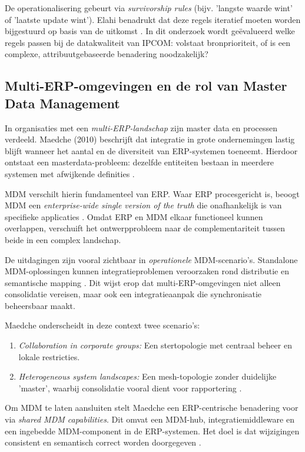 De operationalisering gebeurt via \emph{survivorship rules} (bijv. 'langste waarde wint' of 'laatste update wint'). Elahi benadrukt dat deze regels iteratief moeten worden bijgestuurd op basis van de uitkomst \autocite{Elahi}. In dit onderzoek wordt geëvalueerd welke regels passen bij de datakwaliteit van IPCOM: volstaat bronprioriteit, of is een complexe, attribuutgebaseerde benadering noodzakelijk?

\subsection{Multi-ERP-omgevingen en de rol van Master Data Management}
In organisaties met een \emph{multi-ERP-landschap} zijn master data en processen verdeeld. Maedche (2010) beschrijft dat integratie in grote ondernemingen lastig blijft wanneer het aantal en de diversiteit van ERP-systemen toeneemt. Hierdoor ontstaat een masterdata-probleem: dezelfde entiteiten bestaan in meerdere systemen met afwijkende definities \autocite{Maedche2010}.

MDM verschilt hierin fundamenteel van ERP. Waar ERP procesgericht is, beoogt MDM een \emph{enterprise-wide single version of the truth} die onafhankelijk is van specifieke applicaties \autocite{Maedche2010}. Omdat ERP en MDM elkaar functioneel kunnen overlappen, verschuift het ontwerpprobleem naar de complementariteit tussen beide in een complex landschap.

De uitdagingen zijn vooral zichtbaar in \emph{operationele} MDM-scenario’s. Standalone MDM-oplossingen kunnen integratieproblemen veroorzaken rond distributie en semantische mapping \autocite{Maedche2010}. Dit wijst erop dat multi-ERP-omgevingen niet alleen consolidatie vereisen, maar ook een integratieaanpak die synchronisatie beheersbaar maakt.

Maedche onderscheidt in deze context twee scenario's:
\begin{enumerate}
    \item \emph{Collaboration in corporate groups:} Een stertopologie met centraal beheer en lokale restricties.
    \item \emph{Heterogeneous system landscapes:} Een mesh-topologie zonder duidelijke 'master', waarbij consolidatie vooral dient voor rapportering \autocite{Maedche2010}.
\end{enumerate}

Om MDM te laten aansluiten stelt Maedche een ERP-centrische benadering voor via \emph{shared MDM capabilities}. Dit omvat een MDM-hub, integratiemiddleware en een ingebedde MDM-component in de ERP-systemen. Het doel is dat wijzigingen consistent en semantisch correct worden doorgegeven \autocite{Maedche2010}.

